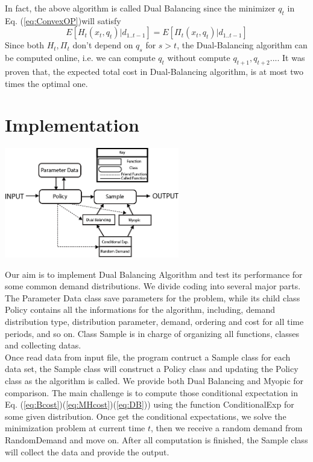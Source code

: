 \documentclass[twoside]{article}
\begin{document}
\begin{multicols}{2}
    In fact, the above algorithm is called Dual Balancing since the minimizer $q_t$ in Eq. (\ref{eq:ConvexOP})will satisfy
    \begin{equation}\label{eq:DB}
        E[H_t(x_t,q_t)| d_{1..t-1}] = E[\Pi_t(x_t,q_t)| d_{1..t-1}]
        \end{equation}
      Since both $H_t,\Pi_t$ don't depend on $q_s$ for $s>t$, the Dual-Balancing algorithm can be computed online, i.e. we can compute $q_t$ without compute $q_{t+1}, q_{t+2} ... $. It was proven that, the expected total cost in Dual-Balancing algorithm,  is at most two times the optimal one\cite{CLAcha2}.


\section{Implementation}


\begin{center}
  \includegraphics[width=3.0in]{software_diagram.png}
\end{center}
Our aim is to implement Dual Balancing Algorithm and test its performance for some common demand distributions. We divide coding into several major parts. The Parameter Data class save parameters for the problem, while its child class Policy contains all the informations for the algorithm, including, demand distribution type, distribution parameter, demand, ordering and cost for all time periods, and so on. Class Sample is in charge of organizing all functions, classes and collecting datas.\\
Once read data from input file, the program contruct a Sample class for each data set, the Sample class will construct a Policy class and updating the Policy class as the algorithm is called. We provide both Dual Balancing and Myopic for comparison. The main challenge is to compute those conditional expectation in Eq. (\ref{eq:Bcost})(\ref{eq:MHcost})(\ref{eq:DB})) using the function ConditionalExp for some given distribution. Once get the conditional expectations, we solve the minimization problem at current time $t$, then we receive a random demand from RandomDemand and move on. After all computation is finished, the Sample class will collect the data and provide the output.




\end{multicols}
\end{document}
